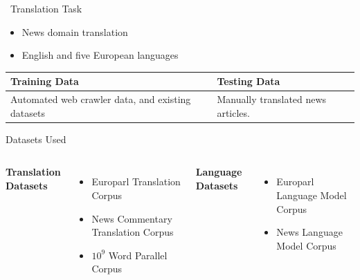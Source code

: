 \begin{frame}{\faLanguage\ Translation Task}
    \begin{itemize}
        \item News domain translation
        \item English and five European languages
    \end{itemize}

    \vfill

    \begin{tabularx}{\textwidth}{XX}
        \toprule
        \textbf{Training Data} & \textbf{Testing Data} \\
        \midrule
        Automated web crawler data, and existing datasets
        & Manually translated news articles. \\
        \bottomrule
    \end{tabularx}
    
    \vfill

    \begin{block}{Datasets Used}
        \begin{columns}

            \textbf{Translation Datasets}
        \begin{itemize}
                \small
            \item Europarl Translation Corpus
            \item News Commentary Translation Corpus
            \item \( 10^9 \) Word Parallel Corpus
        \end{itemize}



            \textbf{Language Datasets}
            \begin{itemize}
                \item Europarl Language Model Corpus
                \item News Language Model Corpus
            \end{itemize}
        \end{columns}
    \end{block}

\end{frame}

